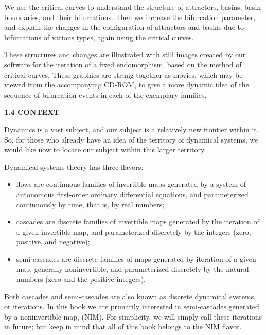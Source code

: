 \documentclass[12pt]{article}
\begin{document}
\hfill

We use the critical curves to understand the structure of attractors,
basins, basin boundaries, and their bifurcations. Then we
increase the bifurcation parameter, and explain the changes in the
configuration of attractors and basins due to bifurcations of various
types, again using the critical curves.

\hfill

These structures and changes are illustrated with still images
created by our software for the iteration of a fixed endomorphism,
based on the method of critical curves. These graphics are strung
together as movies, which may be viewed from the accompanying
CD-ROM, to give a more dynamic idea of the sequence of bifurcation
events in each of the exemplary families.

\hfill

\textbf{1.4 CONTEXT}

\hfill

Dynamics is a vast subject, and our subject is a relatively new
frontier within it. So, for those who already have an idea of the territory
of dynamical systems, we would like now to locate our
subject within this larger territory.

\hfill

Dynamical systems theory has three flavors:

\begin{itemize}
\item flows are continuous families of invertible maps generated
by a system of autonomous first-order ordinary differential
equations, and parameterized continuously by time, that is,
by real numbers;
\item cascades are discrete families of invertible maps generated
by the iteration of a given invertible map, and parameterized
discretely by the integers (zero, positive, and negative);
\item semi-cascades are discrete families of maps generated by
iteration of a given map, generally noninvertible, and
parameterized discretely by the natural numbers (zero and
the positive integers).
\end{itemize}

Both cascades and semi-cascades are also known as discrete
dynamical systems, or iterations. In this book we are primarily
interested in semi-cascades generated by a noninvertible map,
(NIM). For simplicity, we will simply call these iterations in future;
but keep in mind that all of this book belongs to the NIM flavor.
\end{document}
